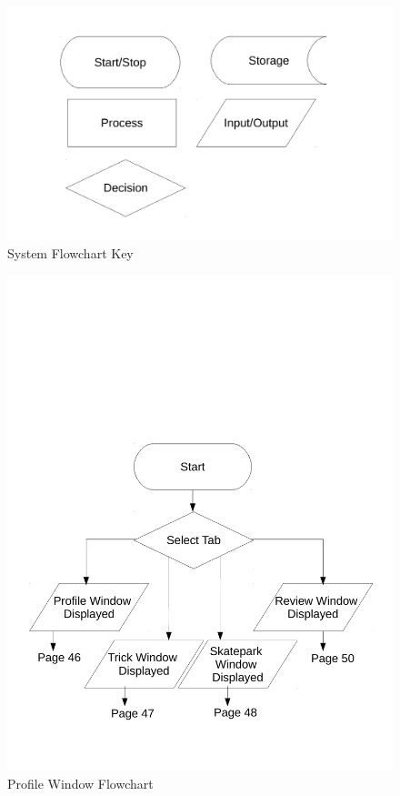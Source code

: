 \begin{figure}[H]
    \includegraphics[width=\textwidth]{./Design/FlowchartKey.pdf}
    \caption{System Flowchart Key} \label{fig:System Flowchart Key}
\end{figure}


\begin{figure}[H]
    \includegraphics[width=\textwidth]{./Design/StartFlowchart.pdf}
    \caption{Profile Window Flowchart} \label{fig:Profile Flowchart}
\end{figure}

